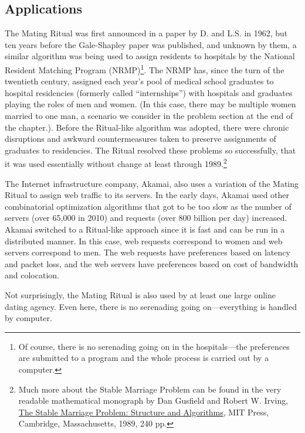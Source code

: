 \subsection{Applications}

The Mating Ritual was first announced in a paper by D.  and
L.S.  in 1962, but ten years before the Gale-Shapley
paper was published, and unknown by them, a similar algorithm was
being used to assign residents to hospitals by the National Resident
Matching Program (NRMP)\footnote{Of course, there is no serenading
  going on in the hospitals---the preferences are submitted to a
  program and the whole process is carried out by a computer.}.  The
NRMP has, since the turn of the twentieth century, assigned each
year's pool of medical school graduates to hospital residencies
(formerly called ``internships'') with hospitals and graduates playing
the roles of men and women.  (In this case, there may be multiple
women married to one man, a scenario we consider in the problem
section at the end of the chapter.).  Before the Ritual-like algorithm
was adopted, there were chronic disruptions and awkward
countermeasures taken to preserve assignments of graduates to
residencies.  The Ritual resolved these problems so successfully, that
it was used essentially without change at least through
1989.\footnote{Much more about the Stable Marriage Problem can be
  found in the very readable mathematical monograph by Dan Gusfield
  and Robert W. Irving,
  \href{http://mitpress.mit.edu/catalog/item/default.asp?ttype=2&tid=7676}{The
    Stable Marriage Problem: Structure and Algorithms}, MIT Press,
  Cambridge, Massachusetts, 1989, 240 pp.}

The Internet infrastructure company, Akamai, also uses a variation of
the Mating Ritual to assign web traffic to its servers.  In the early
days, Akamai used other combinatorial optimization algorithms that got
to be too slow as the number of servers (over 65,000 in 2010) and
requests (over 800 billion per day) increased.  Akamai switched to a
Ritual-like approach since it is fast and can be run in a distributed
manner.  In this case, web requests correspond to women and web
servers correspond to men.  The web requests have preferences based on
latency and packet loss, and the web servers have preferences based on
cost of bandwidth and colocation.

Not surprisingly, the Mating Ritual is also used by at least one large
online dating agency.  Even here, there is no serenading going
on---everything is handled by computer.


